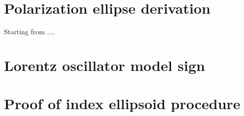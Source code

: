 \section{Polarization ellipse derivation}
\label{sec:deriv_pol_ellipse}
Starting from ....
\section{Lorentz oscillator model sign}
\section{Proof of index ellipsoid procedure}
\label{sec:index_ellipse_proof}

\label{sec:lorentz_model_sign}